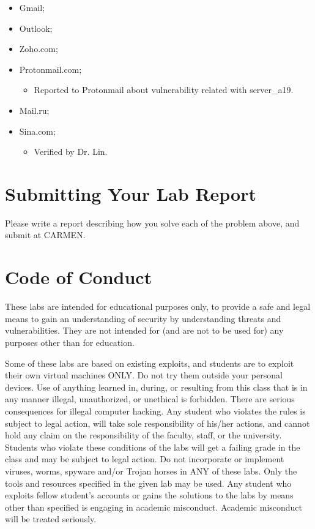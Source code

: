 \documentclass[11pt]{article}
\begin{document}
\begin{itemize}
\item Gmail;
\item Outlook;
\item Zoho.com;
\item Protonmail.com;
  \begin{itemize}
    \item Reported to Protonmail about vulnerability related with server\_a19.
  \end{itemize}
\item Mail.ru;
\item Sina.com;
  \begin{itemize}
    \item Verified by Dr. Lin.
  \end{itemize}
\end{itemize}

\section{Submitting Your Lab Report}

Please write a report describing how you solve each of the problem above, and submit at CARMEN.

\section{Code of Conduct}

These labs are intended for educational purposes only, to provide a safe and legal means to gain an understanding of security by understanding threats and vulnerabilities. They are not intended for (and are not to be used for) any purposes other than for education.

Some of these labs are based on existing exploits, and students are to exploit their own virtual machines ONLY. Do not try them outside your personal devices. Use of anything learned in, during, or resulting from this class that is in any manner illegal, unauthorized, or unethical is forbidden. There are serious consequences for illegal computer hacking. Any student who violates the rules is subject to legal action, will take sole responsibility of his/her actions, and cannot hold any claim on the responsibility of the faculty, staff, or the university. Students who violate these conditions of the labs will get a failing grade in the class and may be subject to legal action.
Do not incorporate or implement viruses, worms, spyware and/or Trojan horses in ANY of these labs. Only the tools and resources specified in the given lab may be used. Any student who exploits fellow student's accounts or gains the solutions to the labs by means other than specified is engaging in academic misconduct. Academic misconduct will be treated seriously.
\end{document}
